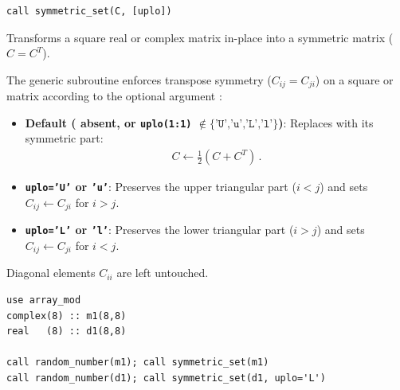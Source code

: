 \lstset{language=[95]Fortran}
\begin{lstlisting}
call symmetric_set(C, [uplo])
\end{lstlisting}

Transforms a square real or complex matrix  in-place into a symmetric matrix ($C = C^T$).

The generic subroutine  enforces transpose symmetry ($C_{ij} = C_{ji}$) on a square  or  matrix  according to the optional argument :
\begin{itemize}
  \item \textbf{Default ( absent, or \texttt{uplo(1:1)} $\notin \{\texttt{'U','u','L','l'}\}$)}: Replaces  with its symmetric part:
  \begin{align}
    C \leftarrow \frac{1}{2}\left(C + C^T\right)\, .
  \end{align}
  \item \textbf{\texttt{uplo='U'} or \texttt{'u'}}: Preserves the upper triangular part ($i < j$) and sets $C_{ij} \leftarrow C_{ji}$ for $i > j$.
  \item \textbf{\texttt{uplo='L'} or \texttt{'l'}}: Preserves the lower triangular part ($i > j$) and sets $C_{ij} \leftarrow C_{ji}$ for $i < j$.
\end{itemize}
Diagonal elements $C_{ii}$ are left untouched.

\begin{description}[leftmargin=2.2cm, style=nextline]
\end{description}

\lstset{language=[95]Fortran}
\begin{lstlisting}
use array_mod
complex(8) :: m1(8,8)
real   (8) :: d1(8,8)

call random_number(m1); call symmetric_set(m1)
call random_number(d1); call symmetric_set(d1, uplo='L')
\end{lstlisting}


